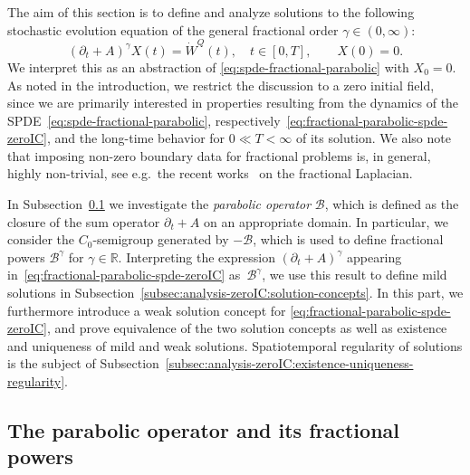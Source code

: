 \documentclass[reqno]{amsart}
\numberwithin{equation}{section}
\newcommand{\R}{\mathbb{R}}
\newcommand{\cB}{\mathcal{B}}
\theoremstyle{remark}
\theoremstyle{definition}
\begin{document}
The aim of this section is to define and analyze solutions to 
the following stochastic evolution equation 
of the general fractional order $\gamma\in(0,\infty)$:  
% 
\begin{equation}
\label{eq:fractional-parabolic-spde-zeroIC} 
(\partial_t + A)^\gamma X (t)
= 
\dot{W}^{Q}(t),  
\quad 
t\in[0,T], 
\qquad 
X(0)=0. 
\end{equation}
% 
We interpret this as an abstraction of 
\eqref{eq:spde-fractional-parabolic} 
with $X_0 = 0$. 
As noted in the introduction, 
we restrict the discussion to a zero initial field, 
since we are primarily interested in 
properties resulting from the 
dynamics of the SPDE~\eqref{eq:spde-fractional-parabolic}, 
respectively~\eqref{eq:fractional-parabolic-spde-zeroIC}, 
and 
the long-time 
behavior 
for $0\ll T < \infty$ 
of its solution. 
We also note that imposing non-zero 
boundary data for fractional problems is, 
in general, highly non-trivial, 
see e.g.~the recent works~\cite{AbatangeloDupaigne2017,HarbirPfeffererRogovs2018} 
on the fractional Laplacian. 
%

In Subsection~\ref{subsec:analysis-zeroIC:parabolic-operator} 
we investigate the \emph{parabolic operator} $\cB$, 
which is defined as the closure of the sum operator $\partial_t + A$ 
on an appropriate domain. 
In particular, we consider the $C_0$-semigroup generated 
by $-\cB$, which is used to define 
fractional powers $\cB^\gamma$ for $\gamma \in \R$. 
Interpreting the expression 
$(\partial_t + A)^\gamma$ appearing 
in~\eqref{eq:fractional-parabolic-spde-zeroIC} 
as~$\cB^\gamma$\!, 
we use this result to define mild solutions 
in Subsection~\ref{subsec:analysis-zeroIC:solution-concepts}. 
In this part, we furthermore introduce  
a weak solution concept 
for \eqref{eq:fractional-parabolic-spde-zeroIC}, 
and prove equivalence 
of the two solution concepts  
as well as   
existence and uniqueness 
of mild and weak solutions. 
Spatiotemporal regularity 
of solutions 
is the subject of  
Subsection~\ref{subsec:analysis-zeroIC:existence-uniqueness-regularity}.

\subsection{The parabolic operator and its fractional powers}
\label{subsec:analysis-zeroIC:parabolic-operator}
\end{document}
